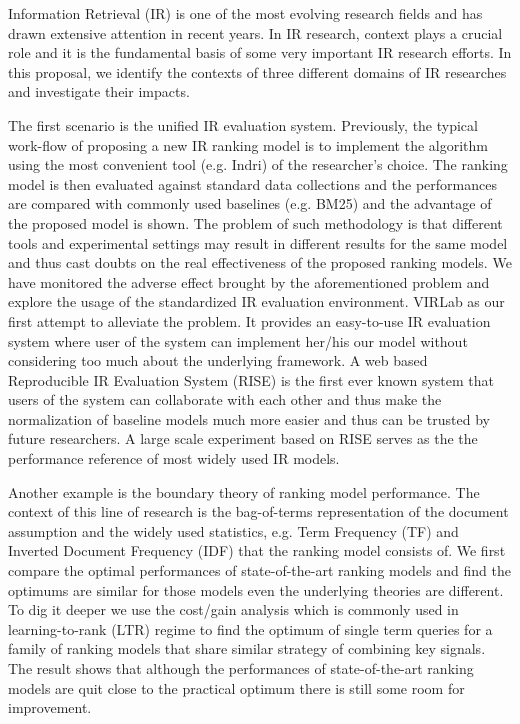 %
%
Information Retrieval (IR) is one of the most evolving research fields 
and has drawn extensive attention in recent years. 
In IR research, context plays a crucial role and it is the fundamental basis 
of some very important IR research efforts.
In this proposal, we identify the contexts of three different domains 
of IR researches and investigate their impacts. 

The first scenario is the unified IR evaluation system. 
Previously, the typical work-flow of proposing a new IR ranking model is to 
implement the algorithm using the most convenient tool (e.g. Indri) of the researcher's choice. 
The ranking model is then evaluated against standard 
data collections and the performances are compared with commonly used 
baselines (e.g. BM25) and the advantage of the proposed model is shown. 
The problem of such methodology is that different tools and experimental 
settings may result in different results for the same model and thus cast 
doubts on the real effectiveness of the proposed ranking models. 
We have monitored the adverse effect brought by the aforementioned problem and 
explore the usage of the standardized IR evaluation environment. 
VIRLab as our first attempt to alleviate the problem. It provides an 
easy-to-use IR evaluation system where user of the system can implement 
her/his our model without considering too much about the underlying framework. 
A web based Reproducible IR Evaluation System (RISE) is the first ever known 
system that users of the system can collaborate with each other and thus make 
the normalization of baseline models much more easier and thus can be trusted 
by future researchers. A large scale experiment based on RISE serves as the 
the performance reference of most widely used IR models.

Another example is the boundary theory of ranking model performance. 
The context of this line of research is the bag-of-terms representation of 
the document assumption and the widely used statistics, e.g. Term Frequency 
(TF) and Inverted Document Frequency (IDF) 
that the ranking model consists of. We first compare the optimal 
performances of state-of-the-art ranking models and find the optimums 
are similar for those models even the underlying theories are different. 
To dig it deeper we use the cost/gain analysis which is commonly used in 
learning-to-rank (LTR) regime to find the optimum of single term queries for 
a family of ranking models that share similar strategy of combining key 
signals. The result shows that although the performances of state-of-the-art 
ranking models are quit close to the practical optimum there is still some 
room for improvement.

